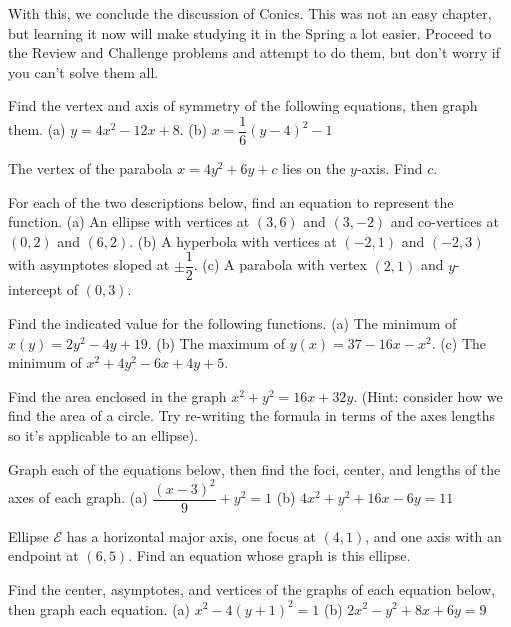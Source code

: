 \documentclass[lang=en,11pt]{elegantbook}
\begin{document}
With this, we conclude the discussion of Conics.  This was not an easy chapter, but learning it now will make studying it in the Spring a lot easier.  Proceed to the Review and Challenge problems and attempt to do them, but don't worry if you can't solve them all.  
\begin{reviewset}
\item Find the vertex and axis of symmetry of the following equations, then graph them. \newline 
(a) $y=4x^2-12x+8$.  (b) $x=\dfrac{1}{6}(y-4)^2-1$  \vspace{3mm}
\item The vertex of the parabola $x=4y^2+6y+c$ lies on the $y$-axis.  Find $c$. \vspace{3mm}
\item For each of the two descriptions below, find an equation to represent the function. \newline 
(a) An ellipse with vertices at $(3,6)$ and $(3,-2)$ and co-vertices at $(0,2)$ and $(6,2)$. \newline
(b) A hyperbola with vertices at $(-2,1)$ and $(-2,3)$ with asymptotes sloped at $\pm\dfrac{1}{2}$. \newline
(c) A parabola with vertex $(2,1)$ and $y$-intercept of $(0,3)$. \vspace{3mm}
\item Find the indicated value for the following functions. \newline 
(a) The minimum of $x(y)=2y^2-4y+19$. \newline 
(b) The maximum of $y(x)=37-16x-x^2$. \newline 
(c) The minimum of $x^2+4y^2-6x+4y+5$. \vspace{3mm}
\item Find the area enclosed in the graph $x^2+y^2=16x+32y$. (Hint: consider how we find the area of a circle.  Try re-writing the formula in terms of the axes lengths so it's applicable to an ellipse). \vspace{3mm}
\item Graph each of the equations below, then find the foci, center, and lengths of the axes of each graph. \newline 
(a) $\dfrac{(x-3)^2}{9}+y^2=1$  (b) $4x^2+y^2+16x-6y=11$  \vspace{3mm}
\item Ellipse $\mathcal{E}$ has a horizontal major axis, one focus at $(4,1)$, and one axis with an endpoint at $(6,5)$.  Find an equation whose graph is this ellipse. \vspace{3mm}
\item Find the center, asymptotes, and vertices of the graphs of each equation below, then graph each equation. \newline
(a) $x^2-4(y+1)^2=1$  (b) $2x^2-y^2+8x+6y=9$   \vspace{3mm}
\end{reviewset}
\end{document}
